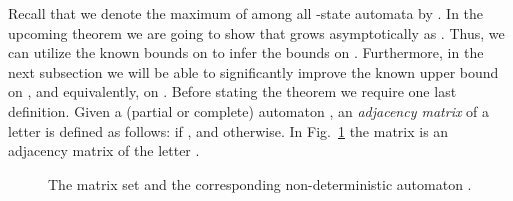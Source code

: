 \documentclass[a4paper,USenglish]{lipics}
\theoremstyle{definition}
\begin{document}
Recall that we denote the maximum of  among all -state automata  by .
In the upcoming theorem we are going to show that  grows asymptotically as . Thus, we can utilize the known bounds on  to infer the bounds on . Furthermore, in the next subsection we will be able to significantly improve the known upper bound on , and equivalently, on . Before stating the theorem we require one last definition. Given a (partial or complete) automaton , an \emph{adjacency matrix}  of a letter  is defined as follows:  if , and  otherwise. In Fig.~\ref{fig:primitive} the matrix  is an adjacency matrix of the letter .

\begin{figure}
\begin{center}
\scalebox{0.8}{

}
\end{center}
\caption{The matrix set  and the corresponding non-deterministic automaton .}
\label{fig:primitive}
\end{figure}
\end{document}
